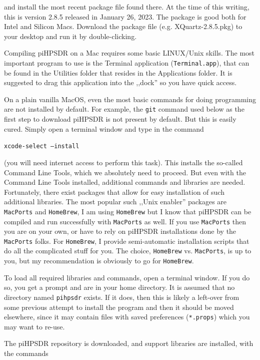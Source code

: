 \documentclass[12pt]{book}
\def\grtt#1{\texttt{\color{magenta}#1}}
\def\pH{pi\-HPSDR }
\begin{document}
and install the most recent package file found there. At the time of this writing, this is version 2.8.5
released in January 26, 2023. The package is good both for Intel and Silicon Macs. Download the package
file (e.g. XQuartz-2.8.5.pkg) to your desktop and run it by double-clicking.

Compiling \pH on a Mac requires some basic LINUX/Unix skills. The most important program to use is
the Terminal application (\texttt{Terminal.app}), that can be found in the Utilities folder that resides
in the Applications folder. It is suggested to drag this application into the ,,dock'' so you have quick
access.

On a plain vanilla MacOS, even the most basic commands for doing programming are not installed
by default. For example, the \grtt{git} command used below as the first step  to download piHPSDR is
not present by default. But this is easily cured. Simply open a terminal window and type in the command

\grtt{xcode-select --install}

(you will need internet access to perform this task). This installs the so-called Command Line Tools,
which we absolutely need to proceed. But even with the Command Line Tools installed, additional
commands and libraries are needed. Fortunately, there exist packages that allow for easy installation
of such additional libraries.
The most popular such ,,Unix enabler'' packages are \texttt{MacPorts} and \texttt{HomeBrew}, I
am using
\texttt{HomeBrew} but I know that \pH can be compiled and run successfully with \texttt{MacPorts}
as well. If you use \texttt{MacPorts} then you are on your own, or
have to rely on \pH installations done by the \texttt{MacPorts} folks. For \texttt{HomeBrew},
I provide semi-automatic installation scripts that do all the complicated stuff for you. The choice,
\texttt{HomeBrew} vs. \texttt{MacPorts}, is up to you, but my recommendation is obviously
to go for \texttt{HomeBrew}.

To load all required libraries and commands, open a terminal window. If you do so, you get
a prompt and are in your home directory. It is assumed that no directory named \texttt{pihpsdr}
exists. If it does, then this is likely a left-over from some previous
attempt to install the program and then it should be moved elsewhere, since it may contain
files with saved preferences (\texttt{*.props}) which you may want to re-use.

The \pH repository is downloaded, and support libraries are installed, with the commands
\end{document}
